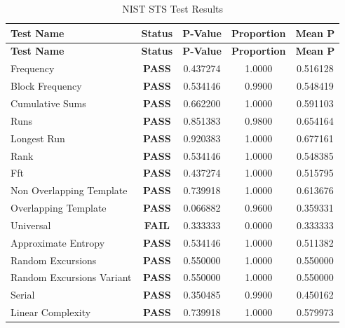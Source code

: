 \documentclass{article}
\begin{document}
\begin{longtable}{lcccc}
\caption{NIST STS Test Results} \\
\toprule
\textbf{Test Name} & \textbf{Status} & \textbf{P-Value} & \textbf{Proportion} & \textbf{Mean P} \\
\midrule
\endfirsthead
\toprule
\textbf{Test Name} & \textbf{Status} & \textbf{P-Value} & \textbf{Proportion} & \textbf{Mean P} \\
\midrule
\endhead
\bottomrule
\endfoot

Frequency & \textcolor{passgreen}{\textbf{PASS}} & 0.437274 & 1.0000 & 0.516128 \\
Block Frequency & \textcolor{passgreen}{\textbf{PASS}} & 0.534146 & 0.9900 & 0.548419 \\
Cumulative Sums & \textcolor{passgreen}{\textbf{PASS}} & 0.662200 & 1.0000 & 0.591103 \\
Runs & \textcolor{passgreen}{\textbf{PASS}} & 0.851383 & 0.9800 & 0.654164 \\
Longest Run & \textcolor{passgreen}{\textbf{PASS}} & 0.920383 & 1.0000 & 0.677161 \\
Rank & \textcolor{passgreen}{\textbf{PASS}} & 0.534146 & 1.0000 & 0.548385 \\
Fft & \textcolor{passgreen}{\textbf{PASS}} & 0.437274 & 1.0000 & 0.515795 \\
Non Overlapping Template & \textcolor{passgreen}{\textbf{PASS}} & 0.739918 & 1.0000 & 0.613676 \\
Overlapping Template & \textcolor{passgreen}{\textbf{PASS}} & 0.066882 & 0.9600 & 0.359331 \\
Universal & \textcolor{failred}{\textbf{FAIL}} & 0.333333 & 0.0000 & 0.333333 \\
Approximate Entropy & \textcolor{passgreen}{\textbf{PASS}} & 0.534146 & 1.0000 & 0.511382 \\
Random Excursions & \textcolor{passgreen}{\textbf{PASS}} & 0.550000 & 1.0000 & 0.550000 \\
Random Excursions Variant & \textcolor{passgreen}{\textbf{PASS}} & 0.550000 & 1.0000 & 0.550000 \\
Serial & \textcolor{passgreen}{\textbf{PASS}} & 0.350485 & 0.9900 & 0.450162 \\
Linear Complexity & \textcolor{passgreen}{\textbf{PASS}} & 0.739918 & 1.0000 & 0.579973 \\

\end{longtable}
\end{document}
